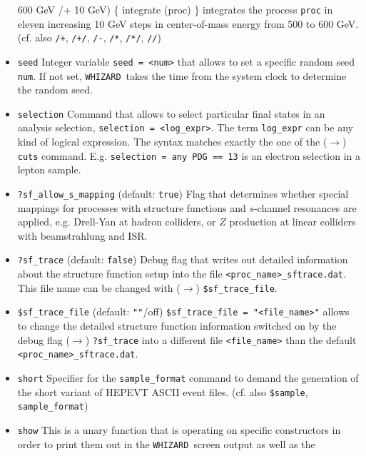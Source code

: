 \documentclass[12pt]{book}
\newcommand{\ttt}[1]{\texttt{#1}}
\newcommand{\whizard}{\texttt{WHIZARD}}
\begin{document}
\begin{itemize}
{  600 GeV /+ 10 GeV) \{ integrate (proc) \} } integrates the process
\ttt{proc} in eleven increasing 10 GeV steps in center-of-mass energy
from 500 to 600 GeV. (cf. also \ttt{/+}, \ttt{/+/}, \ttt{/-},
\ttt{/*}, \ttt{/*/}, \ttt{//})
\item
\ttt{seed} \newline 
Integer variable \ttt{seed = <num>} that allows to set a specific
random seed \ttt{num}. If not set, \whizard\ takes the time from the 
system clock to determine the random seed.
\item
\ttt{selection} \newline
Command that allows to select particular final states in an analysis
selection, \ttt{selection = <log\_expr>}. The term \ttt{log\_expr} can
be any kind of logical expression. The syntax matches exactly
the one of the ($\to$) \ttt{cuts} command. E.g. \ttt{selection = any
PDG == 13} is an electron selection in a lepton sample. 
\item
\ttt{?sf\_allow\_s\_mapping} \qquad (default: \ttt{true}) \newline
Flag that determines whether special mappings for processes with
structure functions and $s$-channel resonances are applied,
e.g. Drell-Yan at hadron colliders, or $Z$ production at linear
colliders with beamstrahlung and ISR.
\item
\ttt{?sf\_trace} \qquad (default: \ttt{false}) \newline
Debug flag that writes out detailed information about the structure
function setup into the file \ttt{<proc\_name>\_sftrace.dat}. This
file name can be changed with ($\to$) \ttt{\$sf\_trace\_file}. 
\item
\ttt{\$sf\_trace\_file} \qquad (default: \ttt{""}/off) \newline
\ttt{\$sf\_trace\_file = "<file\_name>"} allows to change the detailed
structure function information switched on by the debug flag ($\to$)
\ttt{?sf\_trace} into a different file \ttt{<file\_name>} than the
default \ttt{<proc\_name>\_sftrace.dat}. 
\item
\ttt{short} \newline 
Specifier for the \ttt{sample\_format} command to demand the
generation of the short variant of HEPEVT ASCII event
files. (cf. also \ttt{\$sample}, \ttt{sample\_format}) 
\item
\ttt{show} \newline
This is a unary function that is operating on specific constructors in
order to print them out in the \whizard\ screen output as well as the

\end{itemize}
\end{document}
